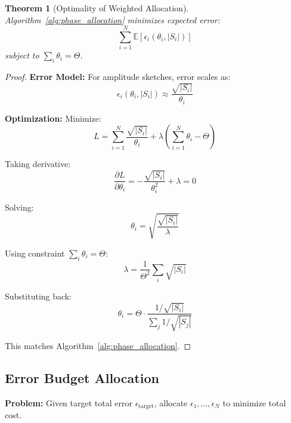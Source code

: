\documentclass[11pt]{article}
\newtheorem{theorem}{Theorem}
\begin{document}
\begin{theorem}[Optimality of Weighted Allocation]
\label{thm:optimal_allocation}
Algorithm~\ref{alg:phase_allocation} minimizes expected error:
\begin{equation}
\sum_{i=1}^N \mathbb{E}[\epsilon_i(\theta_i, |S_i|)]
\end{equation}
subject to $\sum_i \theta_i = \Theta$.
\end{theorem}

\begin{proof}
\textbf{Error Model:} For amplitude sketches, error scales as:
\begin{equation}
\epsilon_i(\theta_i, |S_i|) \approx \frac{\sqrt{|S_i|}}{\theta_i}
\end{equation}

\textbf{Optimization:} Minimize:
\begin{equation}
L = \sum_{i=1}^N \frac{\sqrt{|S_i|}}{\theta_i} + \lambda\left(\sum_{i=1}^N \theta_i - \Theta\right)
\end{equation}

Taking derivative:
\begin{equation}
\frac{\partial L}{\partial \theta_i} = -\frac{\sqrt{|S_i|}}{\theta_i^2} + \lambda = 0
\end{equation}

Solving:
\begin{equation}
\theta_i = \sqrt{\frac{\sqrt{|S_i|}}{\lambda}}
\end{equation}

Using constraint $\sum_i \theta_i = \Theta$:
\begin{equation}
\lambda = \frac{1}{\Theta^2} \sum_i \sqrt{|S_i|}
\end{equation}

Substituting back:
\begin{equation}
\theta_i = \Theta \cdot \frac{1/\sqrt{|S_i|}}{\sum_j 1/\sqrt{|S_j|}}
\end{equation}

This matches Algorithm~\ref{alg:phase_allocation}.
\end{proof}

\subsection{Error Budget Allocation}

\textbf{Problem:} Given target total error $\epsilon_{\text{target}}$, allocate $\epsilon_1, \ldots, \epsilon_N$ to minimize total cost.
\end{document}
